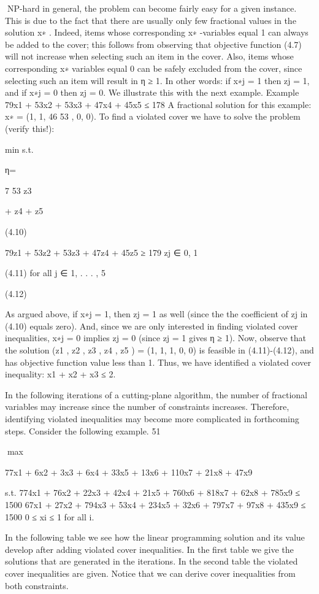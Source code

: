 \documentclass[titlepage]{book}
\theoremstyle{plain}
\theoremstyle{definition}
\theoremstyle{remark}
\begin{document}
NP-hard in general, the problem can become fairly easy for a given instance. This is due to the fact
that there are usually only few fractional values in the solution x∗ . Indeed, items whose corresponding
x∗ -variables equal 1 can always be added to the cover; this follows from observing that objective function
(4.7) will not increase when selecting such an item in the cover. Also, items whose corresponding x∗ variables equal 0 can be safely excluded from the cover, since selecting such an item will result in η ≥ 1.
In other words: if x∗j = 1 then zj = 1, and if x∗j = 0 then zj = 0. We illustrate this with the next
example.
Example
79x1 + 53x2 + 53x3 + 47x4 + 45x5 ≤ 178
A fractional solution for this example: x∗ = (1, 1, 46
53 , 0, 0). To find a violated cover we have to solve the
problem (verify this!):

min
s.t.

η=

7
53 z3

+ z4 + z5

(4.10)

79z1 + 53z2 + 53z3 + 47z4 + 45z5 ≥ 179
zj ∈ {0, 1}

(4.11)
for all j ∈ {1, . . . , 5}

(4.12)

As argued above, if x∗j = 1, then zj = 1 as well (since the the coefficient of zj in (4.10) equals zero). And,
since we are only interested in finding violated cover inequalities, x∗j = 0 implies zj = 0 (since zj = 1
gives η ≥ 1). Now, observe that the solution (z1 , z2 , z3 , z4 , z5 ) = (1, 1, 1, 0, 0) is feasible in (4.11)-(4.12),
and has objective function value less than 1. Thus, we have identified a violated cover inequality:
x1 + x2 + x3 ≤ 2.

In the following iterations of a cutting-plane algorithm, the number of fractional variables may increase
since the number of constraints increases. Therefore, identifying violated inequalities may become more
complicated in forthcoming steps.
Consider the following example.
51

max

77x1 + 6x2 + 3x3 + 6x4 + 33x5 + 13x6 + 110x7 + 21x8 + 47x9

s.t. 774x1 + 76x2 + 22x3 + 42x4 + 21x5 + 760x6 + 818x7 + 62x8 + 785x9 ≤ 1500
67x1 + 27x2 + 794x3 + 53x4 + 234x5 + 32x6 + 797x7 + 97x8 + 435x9 ≤ 1500
0 ≤ xi ≤ 1 for all i.

In the following table we see how the linear programming solution and its value develop after adding
violated cover inequalities. In the first table we give the solutions that are generated in the iterations.
In the second table the violated cover inequalities are given. Notice that we can derive cover inequalities
from both constraints.
\end{document}
